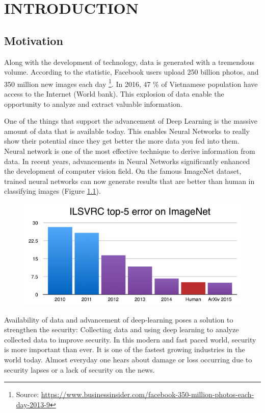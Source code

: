 \chapter{INTRODUCTION}
\label{introduction}
\section{Motivation}
Along with the development of technology, data is generated with a tremendous volume. According to the statistic, Facebook users upload 250 billion photos, and 350 million new images each day \footnote{Source: \url{https://www.businessinsider.com/facebook-350-million-photos-each-day-2013-9}}. In 2016, 47 \% of Vietnamese population have access to the Internet (World bank). This explosion of data enable the opportunity to analyze and extract valuable information.

One of the things that support the advancement of Deep Learning is the massive amount of data that is available today. This enables Neural Networks to really show their potential since they get better the more data you fed into them. Neural network is one of the most effective technique to derive information from data. In recent years, advancements in Neural Networks significantly enhanced the development of computer vision field. On the famous ImageNet dataset, trained neural networks can now generate results that are better than human in classifying images (Figure \ref{chap3:deeplearning_vs_human}). 

\begin{center}
    \begin{figure}[H]
    \centering
    \includegraphics[width=0.75\columnwidth]{images/chap3/deeplearning_vs_human.png}
    \label{chap3:deeplearning_vs_human}
    \end{figure}
\end{center}
Availability of data and advancement of deep-learning poses a solution to strengthen the security: Collecting data and using deep learning to analyze collected data to improve security. 
In this modern and fast paced world, security is more important than ever. It is one of the fastest growing industries in the world today.
Almost everyday one hears about damage or loss occurring due to security lapses or a lack of security on the news. 

